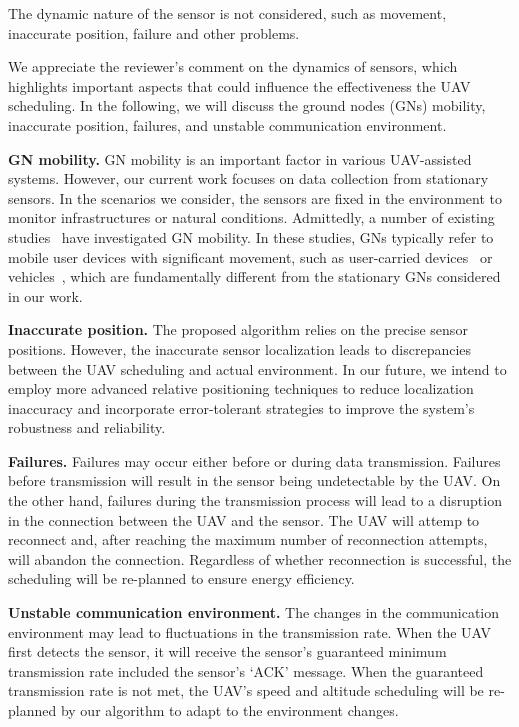 \begin{revcomment}
	The dynamic nature of the sensor is not considered, such as movement, inaccurate position, failure and other problems.
\end{revcomment}
\begin{revresponse}
	We appreciate the reviewer's comment on the dynamics of sensors, which highlights important aspects that could influence the effectiveness the UAV scheduling.
	In the following, we will discuss the ground nodes (GNs) mobility, inaccurate position, failures, and unstable communication environment.

	\textbf{GN mobility.}
	GN mobility is an important factor in various UAV-assisted systems.
	However, our current work focuses on data collection from stationary sensors.
	In the scenarios we consider, the sensors are fixed in the environment to monitor infrastructures or natural conditions.
	Admittedly, a number of existing studies~\cite{GNmob1, GNmob2, GNmob3, GNmob4} have investigated GN mobility. %
	In these studies, GNs typically refer to mobile user devices with significant movement, such as user-carried devices~\cite{GNmob1,GNmob2} or vehicles~\cite{GNmob3,GNmob4}, which are fundamentally different from the stationary GNs considered in our work.

	\textbf{Inaccurate position.}
	The proposed algorithm relies on the precise sensor positions.
	However, the inaccurate sensor localization leads to discrepancies between the UAV scheduling and actual environment.
	In our future, we intend to employ more advanced relative positioning techniques to reduce localization inaccuracy and incorporate error-tolerant strategies to improve the system's robustness and reliability.

	\textbf{Failures.}
	Failures may occur either before or during data transmission.
	Failures before transmission will result in the sensor being undetectable by the UAV.
	On the other hand, failures during the transmission process will lead to a disruption in the connection between the UAV and the sensor.
	The UAV will attemp to reconnect and, after reaching the maximum number of reconnection attempts, will abandon the connection.
	Regardless of whether reconnection is successful, the scheduling will be re-planned to ensure energy efficiency.

	\textbf{Unstable communication environment.}
	The changes in the communication environment may lead to fluctuations in the transmission rate.
	When the UAV first detects the sensor, it will receive the sensor's guaranteed minimum transmission rate included the sensor's `ACK' message.
	When the guaranteed transmission rate is not met, the UAV's speed and altitude scheduling will be re-planned by our algorithm to adapt to the environment changes. 

\end{revresponse}

